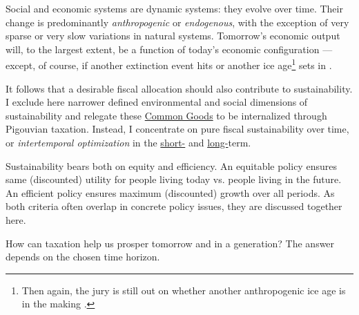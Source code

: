 

Social and economic systems are dynamic systems: they evolve over time. Their change is predominantly \emph{anthropogenic} or \emph{endogenous}, with the exception of very sparse or very slow variations in natural systems. Tomorrow's economic output will, to the largest extent, be a function of today's economic
configuration --- except, of course, if another extinction event hits or another ice age\footnote{
	Then again, the jury is still out on whether another anthropogenic ice age is in the making \citep{UnitedNations2007, Rahmsdorf-2009}.}
sets in \citep{Courtillot2002}.

It follows that a desirable fiscal allocation should also contribute to sustainability. I exclude here narrower defined environmental and social dimensions of sustainability and relegate these \hyperref[CommonGIcood]{Common Goods} to be internalized through Pigouvian taxation. Instead, I concentrate on pure fiscal sustainability over time, or \emph{intertemporal optimization} in the \hyperref[ShortTermSmoothing]{short-} and \hyperref[LongTermSmoothing]{long-}term.

Sustainability bears both on equity and efficiency. An equitable policy ensures same (discounted) utility for people living today vs. people living in the future. An efficient policy ensures maximum (discounted) growth over all periods. As both criteria often overlap in concrete policy issues, they are discussed together here.

How can taxation help us prosper tomorrow and in a generation? The answer depends on the chosen time horizon.


